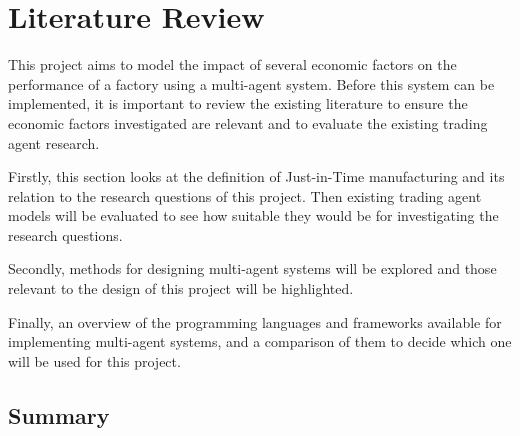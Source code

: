 \section{Literature Review}

This project aims to model the impact of several economic factors on the performance of a factory using a multi-agent system.
Before this system can be implemented, it is important to review the existing literature to ensure the economic factors investigated are relevant and to evaluate the existing trading agent research.

Firstly, this section looks at the definition of Just-in-Time manufacturing and its relation to the research questions of this project.
Then existing trading agent models will be evaluated to see how suitable they would be for investigating the research questions.

Secondly, methods for designing multi-agent systems will be explored and those relevant to the design of this project will be highlighted.

Finally, an overview of the programming languages and frameworks available for implementing multi-agent systems, and a comparison of them to decide which one will be used for this project.







\subsection{Summary}
